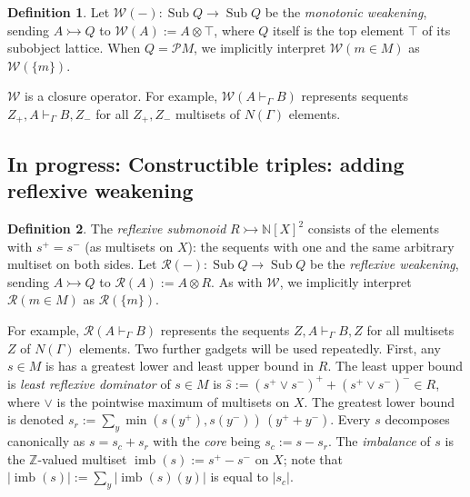 \documentclass{article}
\theoremstyle{definition}
\newtheorem{definition}{Definition}[section]
\newcommand{\N}{\mathbb{N}}
\newcommand{\Z}{\mathbb{Z}}
\newcommand{\cP}{\mathcal{P}}
\newcommand{\cR}{\mathcal{R}}
\newcommand{\cW}{\mathcal{W}}
\newcommand{\Sub}{\operatorname{Sub}}
\newcommand{\imb}{\operatorname{imb}}
\begin{document}
\begin{definition}
    Let $\cW(-)\colon \Sub Q \to \Sub Q$ be the {\it monotonic weakening}, sending $A\rightarrowtail Q$ to $\cW(A):= A \otimes \top$, where $Q$ itself is the top element $\top$ of its subobject lattice. When $Q=\cP M$, we implicitly interpret $\cW(m\in M)$ as $\cW(\{m\})$.
\end{definition}

$\cW$ is a closure operator. For example, $\cW(A\vdash_\Gamma B)$ represents sequents $Z_+, A\vdash_\Gamma B, Z_-$ for all $Z_+,Z_-$ multisets of ${N}(\Gamma)$ elements. 

\subsection{In progress: Constructible triples: adding reflexive weakening}
\label{sec:constructibletriple}


\begin{definition}
    \label{def:reflweak}
    The {\it reflexive submonoid} $R \rightarrowtail \N[X]^2$ consists of the elements with $s^+ = s^-$ (as multisets on $X$): the sequents with one and the same arbitrary multiset on both sides.
    Let $\cR(-)\colon \Sub Q \to \Sub Q$ be the {\it reflexive weakening}, sending $A \rightarrowtail Q$ to $\cR(A):=A\otimes R$. As with $\cW$, we implicitly interpret $\cR(m \in M)$ as $\cR(\{m\})$.
\end{definition}

For example, $\cR(A\vdash_\Gamma B)$ represents the sequents $Z,A\vdash_\Gamma B,Z$ for all multisets $Z$ of $N(\Gamma)$ elements.
Two further gadgets will be used repeatedly. First, any $s \in M$ is has a greatest lower and least upper bound in $R$. The least upper bound is {\it least reflexive dominator} of $s \in M$ is $\hat s := (s^+\vee s^-)^+ + (s^+\vee s^-)^- \in R$, where $\vee$ is the pointwise maximum of multisets on $X$. The greatest lower bound is denoted $s_r:=\sum_y \min(s(y^+),s(y^-))\,(y^++y^-)$. Every $s$ decomposes canonically as $s = s_c + s_r$ with the {\it core} being $s_c:=s-s_r$. The {\it imbalance} of $s$ is the $\Z$-valued multiset $\imb(s):=s^+ - s^-$ on $X$; note that $|\imb(s)|:=\sum_y |\imb(s)(y)|$ is equal to $|s_c|$. 
\end{document}
